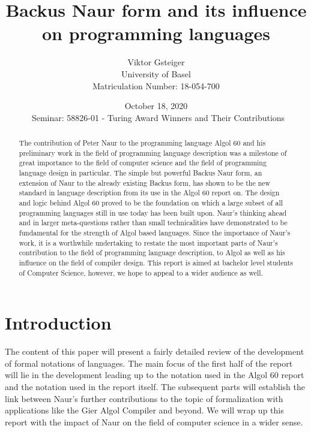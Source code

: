 \documentclass{article}
\author{Viktor Gsteiger \\ University of Basel \\ Matriculation Number: 18-054-700}
\title{Backus Naur form and its influence on programming languages}
\date{October 18, 2020 \\\ Seminar: 58826-01 - Turing Award Winners and Their Contributions}
\begin{document}
\maketitle

\begin{abstract}
	The contribution of Peter Naur to the programming language Algol 60 and his preliminary work in the field of programming language description was a milestone of great importance to the field of computer science and the field of programming language design in particular. The simple but powerful Backus Naur form, an extension of Naur to the already existing Backus form, has shown to be the new standard in language description from its use in the Algol 60 report on. The design and logic behind Algol 60 proved to be the foundation on which a large subset of all programming languages still in use today has been built upon. Naur’s thinking ahead and in larger meta-questions rather than small technicalities have demonstrated to be fundamental for the strength of Algol based languages. Since the importance of Naur’s work, it is a worthwhile undertaking to restate the most important parts of Naur’s contribution to the field of programming language description, to Algol as well as his influence on the field of compiler design. This report is aimed at bachelor level students of Computer Science, however, we hope to appeal to a wider audience as well.
\end{abstract}

\newpage

\section{Introduction}
The content of this paper will present a fairly detailed review of the development of formal notations of languages. The main focus of the first half of the report will lie in the development leading up to the notation used in the Algol 60 report and the notation used in the report itself. The subsequent parts will establish the link between Naur's further contributions to the topic of formalization with applications like the Gier Algol Compiler and beyond. We will wrap up this report with the impact of Naur on the field of computer science in a wider sense.
\end{document}
